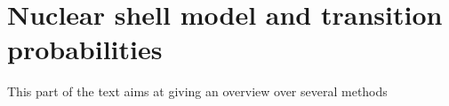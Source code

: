 % 
%
%

\part{Nuclear shell model and transition probabilities}
This part of the text aims at giving an overview over several methods 
